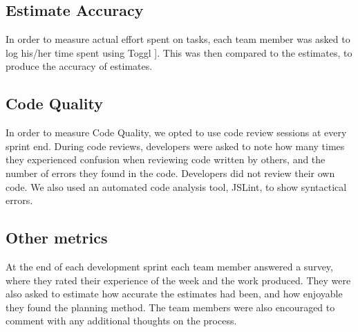 \documentclass{sigchi}
\begin{document}
\subsection{Estimate Accuracy}
In order to measure actual effort spent on tasks, each team member was asked to log his/her time spent using Toggl \cite{Toggl}]. This was then compared to the estimates, to produce the accuracy of estimates.

\subsection{Code Quality}
In order to measure Code Quality, we opted to use code review sessions at every sprint end. During code reviews, developers were asked to note how many times they experienced confusion when reviewing code written by others, and the number of errors they found in the code. Developers did not review their own code.
We also used an automated code analysis tool, JSLint, to show syntactical errors.

\subsection{Other metrics}
At the end of each development sprint each team member answered a survey, where they rated their experience of the week and the work produced. They were also asked to estimate how accurate the estimates had been, and how enjoyable they found the planning method. The team members were also encouraged to comment with any additional thoughts on the process.



%
%
%
%
%
\balance




\end{document}

